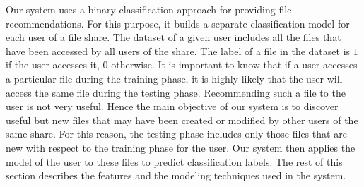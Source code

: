 Our system uses a binary classification approach for providing file
recommendations.  For this purpose, it builds a separate
classification model for each user of a file share.  The dataset of a
given user includes all the files that have been accessed by all 
users of the share.  The label of a file in the dataset is $1$ if the
user accesses it, $0$ otherwise.  It is important to know that if a
user accesses a particular file during the training phase, it is
highly likely that the user will access the same file during the
testing phase.  Recommending such a file to the user is not very
useful.  Hence the main objective of our system is to discover useful
but new files that may have been created or modified by other users of
the same share.  For this reason, the testing phase includes only
those files that are new with respect to the training phase for the
user.  Our system then applies the model of the user to these files to
predict classification labels.  The rest of this section describes the
features and the modeling techniques used in the system.


